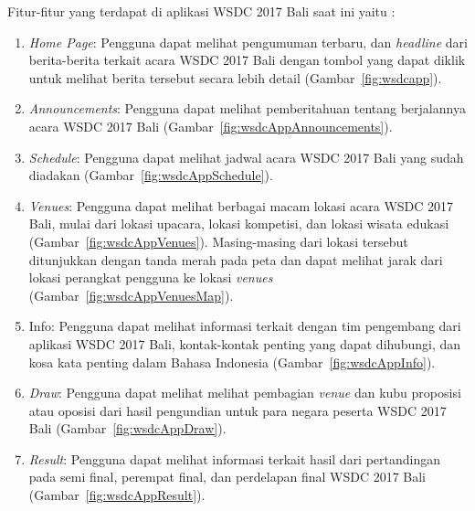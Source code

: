 Fitur-fitur yang terdapat di aplikasi WSDC 2017 Bali saat ini yaitu :

\begin{enumerate}
	\item \textit{Home Page}: Pengguna dapat melihat pengumuman terbaru, dan \textit{headline} dari berita-berita terkait acara WSDC 2017 Bali dengan tombol yang dapat diklik untuk melihat berita tersebut secara lebih detail (Gambar~\ref{fig:wsdcapp}).

	\item {\it Announcements}: Pengguna dapat melihat pemberitahuan tentang berjalannya acara WSDC 2017 Bali (Gambar~\ref{fig:wsdcAppAnnouncements}).

	\item {\it Schedule}: Pengguna dapat melihat jadwal acara WSDC 2017 Bali yang sudah diadakan (Gambar~\ref{fig:wsdcAppSchedule}).

	\item {\it Venues}: Pengguna dapat melihat berbagai macam lokasi acara WSDC 2017 Bali, mulai dari lokasi upacara, lokasi kompetisi, dan lokasi wisata edukasi (Gambar~\ref{fig:wsdcAppVenues}). Masing-masing dari lokasi tersebut ditunjukkan dengan tanda merah pada peta dan dapat melihat jarak dari lokasi perangkat pengguna ke lokasi \textit{venues} (Gambar~\ref{fig:wsdcAppVenuesMap}).

	\item Info: Pengguna dapat melihat informasi terkait dengan tim pengembang dari aplikasi WSDC 2017 Bali, kontak-kontak penting yang dapat dihubungi, dan kosa kata penting dalam Bahasa Indonesia (Gambar~\ref{fig:wsdcAppInfo}).

	\item {\it Draw}: Pengguna dapat melihat melihat pembagian {\it venue} dan kubu proposisi atau oposisi dari hasil pengundian untuk para negara peserta WSDC 2017 Bali (Gambar~\ref{fig:wsdcAppDraw}).

	\item {\it Result}: Pengguna dapat melihat informasi terkait hasil dari pertandingan pada semi final, perempat final, dan perdelapan final WSDC 2017 Bali (Gambar~\ref{fig:wsdcAppResult}).
\end{enumerate}

